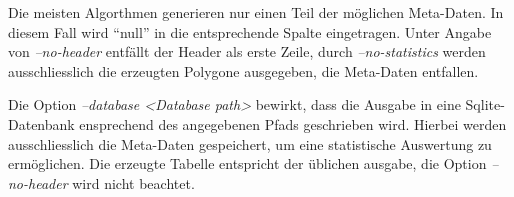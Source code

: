     Die meisten Algorthmen generieren nur einen Teil der möglichen Meta-Daten.
    In diesem Fall wird \enquote{null} in die entsprechende Spalte eingetragen.
    Unter Angabe von \emph{--no-header} entfällt der Header als erste Zeile,
    durch \emph{--no-statistics} werden ausschliesslich die erzeugten Polygone
    ausgegeben, die Meta-Daten entfallen.

    Die Option \emph{--database <Database path>} bewirkt, dass die Ausgabe in
    eine Sqlite-Datenbank ensprechend des angegebenen Pfads geschrieben wird.
    Hierbei werden ausschliesslich die Meta-Daten gespeichert, um eine
    statistische Auswertung zu ermöglichen. Die erzeugte Tabelle entspricht der
    üblichen ausgabe, die Option \emph{--no-header} wird nicht beachtet.
